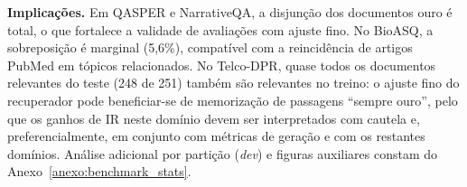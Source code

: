 \textbf{Implicações.}
Em QASPER e NarrativeQA, a disjunção dos documentos ouro é total, o que fortalece a validade de avaliações com ajuste fino. No BioASQ, a sobreposição é marginal (5,6\%), compatível com a reincidência de artigos PubMed em tópicos relacionados. No Telco-DPR, quase todos os documentos relevantes do teste (248 de 251) também são relevantes no treino: o ajuste fino do recuperador pode beneficiar-se de memorização de passagens ``sempre ouro'', pelo que os ganhos de IR neste domínio devem ser interpretados com cautela e, preferencialmente, em conjunto com métricas de geração e com os restantes domínios. Análise adicional por partição (\textit{dev}) e figuras auxiliares constam do Anexo~\ref{anexo:benchmark_stats}.

